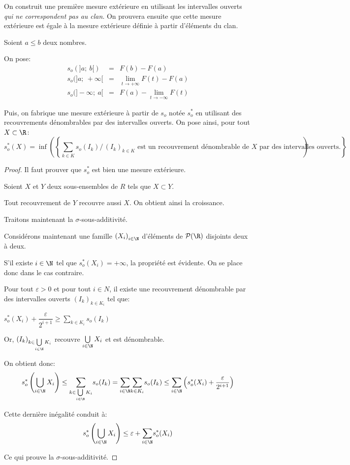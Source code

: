 On construit une première mesure extérieure en utilisant les intervalles ouverts \emph{qui ne correspondent pas au clan}. On prouvera ensuite que cette mesure extérieure est égale à la mesure extérieure définie à partir d'éléments du clan.

\begin{de}
Soient $a \leq b$ deux nombres.

On pose:
\[
\begin{array}{lcl}
s_o\left(]a;~b[\right) & = & F(b)-F(a) \\
s_o(]a;~+\infty[ & = &  \lim \limits_{t \to +\infty} F(t) - F(a)\\
s_o(]-\infty;~a[ & = & F(a)-\lim \limits_{t \to -\infty} F(t)
\end{array}
\]


Puis, on fabrique une mesure extérieure à partir de $s_o$ notée $s_o^{*}$ en utilisant des recouvrements dénombrables par des intervalles ouverts. On pose ainsi, pour tout $X \subset \R$:
\[
s_o^{*}(X) = \inf\left(\left\{ \sum \limits_{k \in K} s_o(I_k)/ \, (I_k)_{k \in K} \text{ est un recouvrement dénombrable de $X$ par des intervalles ouverts.}\right\}\right)
\]
\end{de}

\begin{proof}
Il faut prouver que $s_o^{*}$ est bien une mesure extérieure.

Soient $X$ et $Y$ deux sous-ensembles de $R$ tels que $X \subset Y$.

Tout recouvrement de $Y$ recouvre aussi $X$. On obtient ainsi la croissance.

Traitons maintenant la $\sigma$-sous-additivité.

Considérons maintenant une famille $\left(X_i\right)_{i \in \N}$ d'éléments  de $\mathcal{P}(\R)$ disjoints deux à deux.

S'il existe  $i \in \N$ tel que $s_o^{*}(X_i) = +\infty$, la propriété est évidente. On se place donc dans le cas contraire.

Pour tout $\varepsilon > 0$ et pour tout $i \in N$, il existe une recouvrement dénombrable par des intervalles ouverts $\left(I_k\right)_{k \in K_i}$ tel que:

$
s_o^{*}(X_i) + \dfrac{\varepsilon}{2^{i+1}} \geq \displaystyle{\sum \limits_{k \in K_i}} s_o(I_k) 
$

Or, $\left(I_k\right)_{k \in \bigcup \limits_{i \in \N} K_i}$ recouvre $\bigcup \limits_{i \in \N} X_i$ et est dénombrable.

On obtient donc:
\[
s_o^{*}\left(\bigcup \limits_{i \in \N} X_i\right) \leq \displaystyle{\sum \limits_{k \in \bigcup \limits_{i \in \N} K_i}} s_o(I_k) = \displaystyle{\sum \limits_{i \in \N}} \displaystyle{\sum \limits_{k \in K_i}} s_o(I_k) \leq \displaystyle{\sum \limits_{i \in \N}} \left(s_o^{*}(X_i) + \dfrac{\varepsilon}{2^{i+1}}\right)
\]

Cette dernière inégalité conduit à:
\[
s_o^{*}\left(\bigcup \limits_{i \in \N} X_i\right) \leq  \varepsilon + \displaystyle{\sum \limits_{i \in \N}} s_o^{*}(X_i)
\]

Ce qui prouve la $\sigma$-sous-additivité.
\end{proof}



